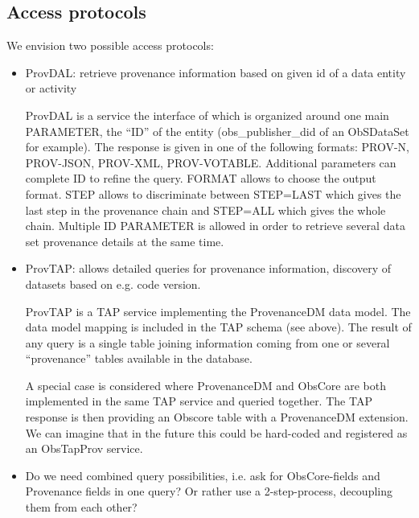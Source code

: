 \subsection{Access protocols}
We envision two possible access protocols:
\begin{itemize}
\item ProvDAL: retrieve provenance information based on given id of a data entity or activity

ProvDAL is a service the interface of which is organized around one main PARAMETER, the ``ID'' of the entity (obs\_publisher\_did of an ObSDataSet for example). The response is given in one of the following formats: PROV-N, PROV-JSON, PROV-XML, PROV-VOTABLE. Additional parameters can complete ID to refine the query. FORMAT allows to choose the output format. STEP allows to discriminate between STEP=LAST which gives the last step in the provenance chain and STEP=ALL which gives the whole chain.
Multiple ID PARAMETER is allowed in order to retrieve several data set provenance details at the same time.
\item ProvTAP: allows detailed queries for provenance information, discovery of datasets based on 
e.g. code version.

ProvTAP is a TAP service implementing the ProvenanceDM data model. The data model mapping is included in the TAP schema (see above). The result of any query is a single table joining information coming from one or several ``provenance'' tables available in the database. 

A special case is considered where ProvenanceDM and ObsCore are both implemented in the same TAP service and queried together. The TAP response is then providing an Obscore table with a ProvenanceDM extension. We can imagine that in the future this could be hard-coded and registered as an ObsTapProv service. 


\item Do we need combined query possibilities, i.e. ask for ObsCore-fields and Provenance fields
in one query? Or rather use a 2-step-process, decoupling them from each other?
\end{itemize}


